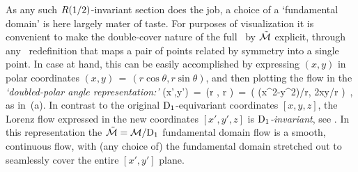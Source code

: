 

As any such $R(1/2)$-invariant section does the job, a
choice of a `fundamental domain' is here largely mater of
taste. For purposes of visualization it is convenient to make
the double-cover nature of the full \statesp\ by $\tilde{{\cal M}}$
explicit, through any \statesp\ redefinition that maps a pair
of points related by symmetry into a single point. In case at
hand, this can be easily accomplished by expressing $(x,y)$ in
polar coordinates $(x,y) \,=\, (r \cos \theta , r \sin
\theta)$, and then plotting the flow in the
\emph{`doubled-polar angle representation:'}
\beq
(x',y') \,=\, (r \theta , r \theta)
        \,=\, ( (x^2-y^2)/r, 2xy/r )
\,,
\label{doubledPolar}
\eeq
as in \,(a). In contrast to the
original $\mathrm{D}_{1}$-equivariant coordinates $[x,y,z]$, the Lorenz flow
expressed in the new coordinates $[x',y',z]$ is {\em
$\mathrm{D}_{1}$-invariant}, see . In this
representation the $\tilde{{\cal M}}={\cal M}/\mathrm{D}_1$ fundamental domain
flow is a smooth, continuous flow, with  (any choice of) the
fundamental domain stretched out to seamlessly  cover the
entire $[x',y']$ plane.

